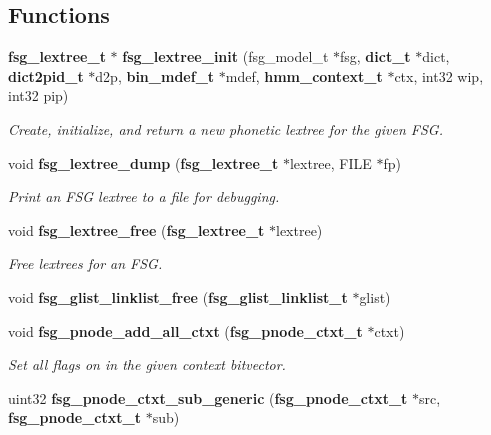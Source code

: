 \subsection*{Functions}
\begin{DoxyCompactItemize}
\item 
{\bf fsg\-\_\-lextree\-\_\-t} $\ast$ {\bf fsg\-\_\-lextree\-\_\-init} (fsg\-\_\-model\-\_\-t $\ast$fsg, {\bf dict\-\_\-t} $\ast$dict, {\bf dict2pid\-\_\-t} $\ast$d2p, {\bf bin\-\_\-mdef\-\_\-t} $\ast$mdef, {\bf hmm\-\_\-context\-\_\-t} $\ast$ctx, int32 wip, int32 pip)\label{fsg__lextree_8c_a8c47b2983b3952886a4c889a711e1d65}

\begin{DoxyCompactList}\small\item\em Create, initialize, and return a new phonetic lextree for the given F\-S\-G. \end{DoxyCompactList}\item 
void {\bf fsg\-\_\-lextree\-\_\-dump} ({\bf fsg\-\_\-lextree\-\_\-t} $\ast$lextree, F\-I\-L\-E $\ast$fp)\label{fsg__lextree_8c_a5c267f09b8dc214dd7deb41232d84726}

\begin{DoxyCompactList}\small\item\em Print an F\-S\-G lextree to a file for debugging. \end{DoxyCompactList}\item 
void {\bf fsg\-\_\-lextree\-\_\-free} ({\bf fsg\-\_\-lextree\-\_\-t} $\ast$lextree)\label{fsg__lextree_8c_a2f1ab965df1214f4d0e2008833aa20da}

\begin{DoxyCompactList}\small\item\em Free lextrees for an F\-S\-G. \end{DoxyCompactList}\item 
void {\bfseries fsg\-\_\-glist\-\_\-linklist\-\_\-free} ({\bf fsg\-\_\-glist\-\_\-linklist\-\_\-t} $\ast$glist)\label{fsg__lextree_8c_a3931da8d9c5b2709c58755d5f15faaf5}

\item 
void {\bf fsg\-\_\-pnode\-\_\-add\-\_\-all\-\_\-ctxt} ({\bf fsg\-\_\-pnode\-\_\-ctxt\-\_\-t} $\ast$ctxt)\label{fsg__lextree_8c_a98fd94d024df264025e30c909c82cb56}

\begin{DoxyCompactList}\small\item\em Set all flags on in the given context bitvector. \end{DoxyCompactList}\item 
uint32 {\bf fsg\-\_\-pnode\-\_\-ctxt\-\_\-sub\-\_\-generic} ({\bf fsg\-\_\-pnode\-\_\-ctxt\-\_\-t} $\ast$src, {\bf fsg\-\_\-pnode\-\_\-ctxt\-\_\-t} $\ast$sub)\label{fsg__lextree_8c_aa9ff81fb4f5d873188fcf3be3f5fc18e}


\end{DoxyCompactItemize}
